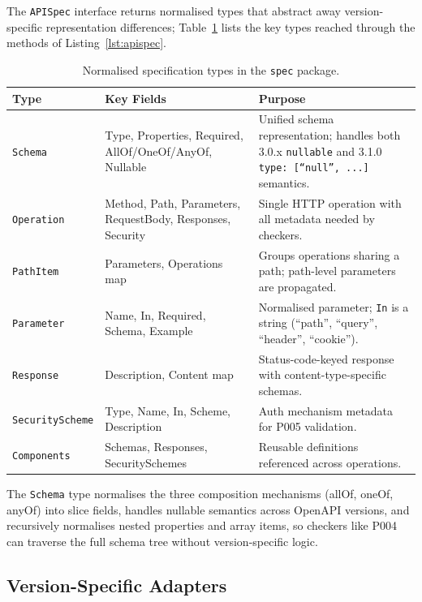 The \texttt{APISpec} interface returns normalised types that abstract away version-specific representation differences; Table~\ref{tab:normalized-types} lists the key types reached through the methods of Listing~\ref{lst:apispec}.

\begin{table}[htbp]
\centering
\caption{Normalised specification types in the \texttt{spec} package.}
\label{tab:normalized-types}
\footnotesize
\begin{tabular}{@{}p{2.6cm}p{4.6cm}p{5.6cm}@{}}
\toprule
\textbf{Type} & \textbf{Key Fields} & \textbf{Purpose} \\
\midrule
\texttt{Schema}       & Type, Properties, Required, AllOf/OneOf/AnyOf, Nullable & Unified schema representation; handles both 3.0.x \texttt{nullable} and 3.1.0 \texttt{type: [``null'', ...]} semantics. \\
\texttt{Operation}    & Method, Path, Parameters, RequestBody, Responses, Security & Single HTTP operation with all metadata needed by checkers. \\
\texttt{PathItem}     & Parameters, Operations map & Groups operations sharing a path; path-level parameters are propagated. \\
\texttt{Parameter}    & Name, In, Required, Schema, Example & Normalised parameter; \texttt{In} is a string (``path'', ``query'', ``header'', ``cookie''). \\
\texttt{Response}     & Description, Content map & Status-code-keyed response with content-type-specific schemas. \\
\texttt{SecurityScheme} & Type, Name, In, Scheme, Description & Auth mechanism metadata for P005 validation. \\
\texttt{Components}   & Schemas, Responses, SecuritySchemes & Reusable definitions referenced across operations. \\
\bottomrule
\end{tabular}
\end{table}

The \texttt{Schema} type normalises the three composition mechanisms (allOf, oneOf, anyOf) into slice fields, handles nullable semantics across OpenAPI versions, and recursively normalises nested properties and array items, so checkers like P004 can traverse the full schema tree without version-specific logic.

\subsection{Version-Specific Adapters}
\label{subsec:version-adapters}

